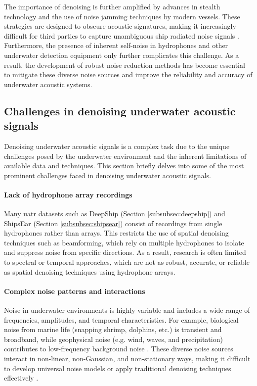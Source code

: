 The importance of denoising is further amplified by advances in stealth technology and the use of noise jamming techniques by modern vessels. These strategies are designed to obscure acoustic signatures, making it increasingly difficult for third parties to capture unambiguous ship radiated noise signals \cite{li_research_2023}. Furthermore, the presence of inherent self-noise in hydrophones and other underwater detection equipment only further complicates this challenge. As a result, the development of robust noise reduction methods has become essential to mitigate these diverse noise sources and improve the reliability and accuracy of underwater acoustic systems.

\subsection{Challenges in denoising underwater acoustic signals}

Denoising underwater acoustic signals is a complex task due to the unique challenges posed by the underwater environment and the inherent limitations of available data and techniques. This section briefly delves into some of the most prominent challenges faced in denoising underwater acoustic signals.

\paragraph{Lack of hydrophone array recordings} 
Many \acrlong{uatr} datasets such as DeepShip (Section \ref{subsubsec:deepship}) and ShipsEar (Section \ref{subsubsec:shipsear}) consist of recordings from single hydrophones rather than arrays. This restricts the use of spatial denoising techniques such as beamforming, which rely on multiple hydrophones to isolate and suppress noise from specific directions. As a result, research is often limited to spectral or temporal approaches, which are not as robust, accurate, or reliable as spatial denoising techniques using hydrophone arrays.

\paragraph{Complex noise patterns and interactions}
Noise in underwater environments is highly variable and includes a wide range of frequencies, amplitudes, and temporal characteristics. For example, biological noise from marine life (snapping shrimp, dolphins, etc.) is transient and broadband, while geophysical noise (e.g. wind, waves, and precipitation) contributes to low-frequency background noise \cite{gao_underwater_2024}. These diverse noise sources interact in non-linear, non-Gaussian, and non-stationary ways, making it difficult to develop universal noise models or apply traditional denoising techniques effectively \cite{song_method_2024, li_research_2023}.

